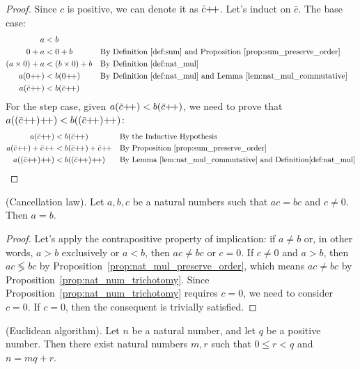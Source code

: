 \begin{proof}
    Since $c$ is positive, we can denote it as $\bar{c}\operatorname{\!+\!+}$. Let's induct on $\bar{c}$. The base case: 
    \begin{align*}
        a &< b\\
        0 + a &<0 + b && \text{By Definition~\ref{def:sum} and Proposition~\ref{prop:sum_preserve_order}}\\
        (a\times 0) + a &<(b\times 0) + b && \text{By Definition~\ref{def:nat_mul}}\\
        a(0\next) &< b(0\next) && \text{By Definition~\ref{def:nat_mul} and Lemma~\ref{lem:nat_mul_commutative}}\\
        a(\bar{c}\next) &< b(\bar{c}\next)
    \end{align*}
    For the step case, given $a(\bar{c}\operatorname{\!+\!+})<b(\bar{c}\operatorname{\!+\!+})$, we need to prove that $a((\bar{c}\next)\next)<b((\bar{c}\next) \next)$:
    \begin{align*}
        a(\bar{c}\next)&<b(\bar{c}\next) && \text{By the Inductive Hypothesis}\\
        a(\bar{c}\next) + \bar{c}\next &< b(\bar{c}\next) + \bar{c}\next &&  \text{By Proposition~\ref{prop:sum_preserve_order}}\\
        a((\bar{c}\next)\next)&<b((\bar{c}\next) \next) && \text{By Lemma~\ref{lem:nat_mul_commutative} and Definition\ref{def:nat_mul}}
    \end{align*}
\end{proof}

\begin{corollary}
    \textup{(Cancellation law).} Let $a, b, c$ be a natural numbers such that $ac=bc$ and $c\neq 0$. Then $a=b$. 
\end{corollary}
\begin{proof}
Let's apply the contrapositive property of implication: if $a\neq b$ or, in other words, $a>b$ exclusively or $a<b$, then $ac\neq bc$ or $c=0$. If $c\neq 0$ and $a>b$, then $ac\lessgtr bc$ by Proposition~\ref{prop:nat_mul_preserve_order}, which means $ac\neq bc$ by Proposition~\ref{prop:nat_num_trichotomy}. Since Proposition~\ref{prop:nat_num_trichotomy} requires $c=0$, we need to consider $c=0$. If $c = 0$, then the consequent is trivially satisfied.
\end{proof}
\begin{proposition}
     \textup{(Euclidean algorithm).} Let $n$ be a natural number, and let $q$ be a positive number. Then there exist natural numbers $m, r$ such that $0 \leq r < q$ and $n = mq + r$\label{prop:euclidean_alg}.
\end{proposition}

